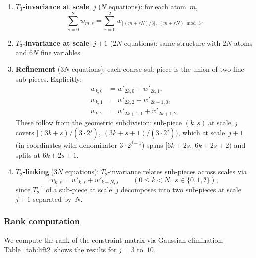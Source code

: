 \documentclass[11pt,a4paper]{article}
\begin{document}
\begin{enumerate}
\item \textbf{$T_3$-invariance at scale~$j$} ($N$ equations):
  for each atom~$m$,
  \[
  \sum_{s=0}^{2} w_{m,s}
  = \sum_{r=0}^{2} w_{\lfloor(m+rN)/3\rfloor,\;(m+rN)\bmod 3}.
  \]

\item \textbf{$T_3$-invariance at scale~$j\!+\!1$} ($2N$ equations):
  same structure with $2N$ atoms and $6N$ fine variables.

\item \textbf{Refinement} ($3N$ equations):
  each coarse sub-piece is the union of two fine sub-pieces.
  Explicitly:
  \begin{align*}
  w_{k,0} &= w'_{2k,0} + w'_{2k,1}, \\
  w_{k,1} &= w'_{2k,2} + w'_{2k+1,0}, \\
  w_{k,2} &= w'_{2k+1,1} + w'_{2k+1,2}.
  \end{align*}
  These follow from the geometric subdivision: sub-piece $(k,s)$
  at scale~$j$ covers $[(3k+s)/(3 \cdot 2^j),\; (3k+s+1)/(3 \cdot 2^j))$,
  which at scale~$j+1$ (in coordinates with denominator $3 \cdot 2^{j+1}$)
  spans $[6k+2s,\; 6k+2s+2)$ and splits at $6k+2s+1$.

\item \textbf{$T_2$-linking} ($3N$ equations):
  $T_2$-invariance relates sub-pieces across scales via
  \[
  w_{k,s} = w'_{k,s} + w'_{k+N,s}
  \qquad (0 \le k < N,\; s \in \{0,1,2\}),
  \]
  since $T_2^{-1}$ of a sub-piece at scale~$j$ decomposes into
  two sub-pieces at scale~$j+1$ separated by~$N$.
\end{enumerate}

\subsubsection*{Rank computation}

We compute the rank of the constraint matrix via Gaussian elimination.
Table~\ref{tab:lift2} shows the results for $j = 3$ to~$10$.
\end{document}
